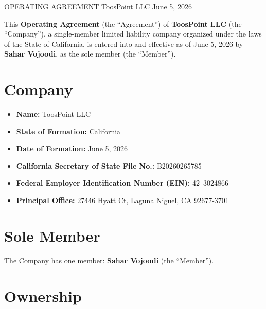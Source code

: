 \documentclass{toospoint}
\begin{document}
\contracttitle
  {OPERATING AGREEMENT}
  {ToosPoint LLC}
  {June 5, 2026}

\begin{clausebox}
\sffamily\small
This \textbf{Operating Agreement} (the ``Agreement'') of \textbf{ToosPoint
LLC} (the ``Company''), a single-member limited liability company organized
under the laws of the State of California, is entered into and effective as
of June 5, 2026 by \textbf{Sahar Vojoodi}, as the sole member (the ``Member'').
\end{clausebox}

\vspace{10pt}

\section{Company}

\begin{itemize}[leftmargin=1.5em, itemsep=4pt, topsep=4pt]
  \item \textbf{Name:} ToosPoint LLC
  \item \textbf{State of Formation:} California
  \item \textbf{Date of Formation:} June 5, 2026
  \item \textbf{California Secretary of State File No.:} B20260265785
  \item \textbf{Federal Employer Identification Number (EIN):} 42--3024866
  \item \textbf{Principal Office:} 27446 Hyatt Ct, Laguna Niguel, CA 92677-3701
\end{itemize}

\section{Sole Member}

The Company has one member: \textbf{Sahar Vojoodi} (the ``Member'').

\section{Ownership}
\end{document}
